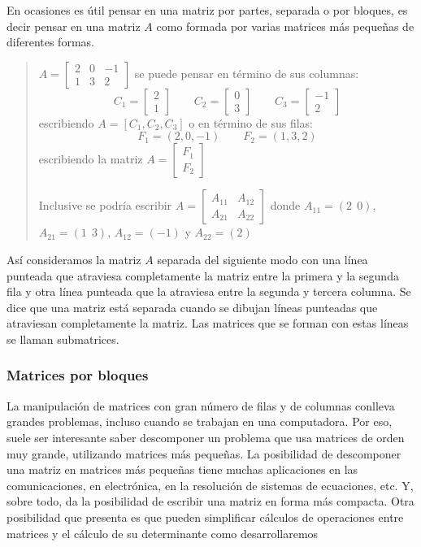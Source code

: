 En ocasiones es útil pensar en una matriz por partes, separada o por bloques, es decir pensar en una matriz \(A\) como formada por varias matrices más pequeñas de diferentes formas.
\begin{quote}
  \ejemplo{}
  
  \(A=\begin{bmatrix}
  2 & 0 & -1\\
  1 & 3 & 2
\end{bmatrix}\) se puede pensar en término de sus columnas: 
\[
  C_1 = \begin{bmatrix}
    2 \\ 1
  \end{bmatrix} \qquad C_2 = \begin{bmatrix}
    0 \\ 3
  \end{bmatrix} \qquad C_3 = \begin{bmatrix}
    -1 \\ 2
  \end{bmatrix} 
\]
escribiendo \(A=\left[C_1, C_2, C_3\right]\) o en término de sus filas:
\[
  F_1 = \left(2,0,-1\right) \qquad F_2 = \left(1,3,2\right)
\]
escribiendo la matriz \(A = \begin{bmatrix}
  F_1 \\ F_2
\end{bmatrix}\)

Inclusive se podría escribir \(A= \begin{bmatrix}
  A_{11} & A_{12}\\
  A_{21} & A_{22}
\end{bmatrix}\) donde \(A_{11}=(2 ~~ 0)\), \(A_{21}=(1 ~~ 3)\), \(A_{12}=(-1)\) y \(A_{22}=(2)\)
\end{quote}
Así consideramos la matriz \(A\) separada del siguiente modo con una línea punteada que atraviesa completamente la matriz entre la primera y la segunda fila y otra línea punteada que la atraviesa entre la segunda y tercera columna. Se dice que una matriz está separada cuando se dibujan líneas punteadas que atraviesan completamente la matriz. Las matrices que se forman con estas líneas se llaman submatrices.

\subsubsection{Matrices por bloques}

La manipulación de matrices con gran número de filas y de columnas conlleva grandes problemas, incluso cuando se trabajan en una computadora. Por eso, suele ser interesante saber descomponer un problema que usa matrices de orden muy grande, utilizando matrices más pequeñas. La posibilidad de descomponer una matriz en matrices más pequeñas tiene muchas aplicaciones en las comunicaciones, en electrónica, en la resolución de sistemas de ecuaciones, etc. Y, sobre todo, da la posibilidad de escribir una matriz en forma más compacta. Otra posibilidad que presenta es que pueden simplificar cálculos de operaciones entre matrices y el cálculo de su determinante como desarrollaremos

